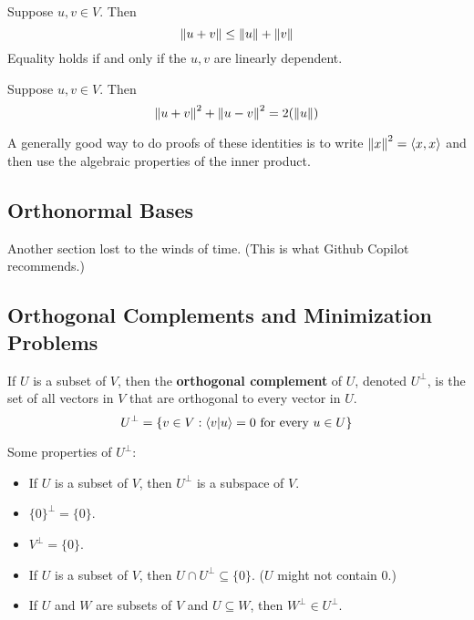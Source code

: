 \begin{theorem} 
    Suppose $u, v \in V$. Then
    \[ \norm{u + v} \leq \norm{u} + \norm{v} \]
    Equality holds if and only if the $u, v$ are linearly dependent.
\end{theorem}

\begin{theorem} 
    Suppose $u, v \in V$. Then
    \[ \norm{u + v}^2 + \norm{u - v}^2 = 2(\norm{u}) \]
\end{theorem}

A generally good way to do proofs of these identities is to write $\norm{x}^2 = \left\langle x , x \right\rangle$ and then
use the algebraic properties of the inner product.

\subsection{Orthonormal Bases}

Another section lost to the winds of time. (This is what Github Copilot recommends.)

\subsection{Orthogonal Complements and Minimization Problems}

\begin{definition} 
    If $U$ is a subset of $V$, then the \textbf{orthogonal complement} of $U$, denoted $U^\perp$, is the set of all
    vectors in $V$ that are orthogonal to every vector in $U$.
    \[ U^\perp = \{v \in V : \innerproduct{v}{u} = 0 \text{ for every } u \in U\} \]
\end{definition}

\begin{theorem}
    Some properties of $U^\perp$:
    \begin{itemize}
        \item If $U$ is a subset of $V$, then $U^\perp$ is a subspace of $V$.
        \item $\{0\}^\perp = \{0\}$.
        \item $V^\perp = \{0\}$.
        \item If $U$ is a subset of $V$, then $U \cap U^\perp \subseteq \{0\}$. ($U$ might not contain $0$.)
        \item If $U$ and $W$ are subsets of $V$ and $U \subseteq W$, then $W^\perp \in U^\perp$.
    \end{itemize}
\end{theorem}

